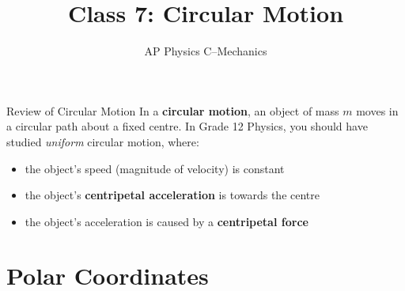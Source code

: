 \documentclass[12pt,compress,aspectratio=169]{beamer}
\title{Class 7: Circular Motion}
\subtitle{AP Physics C--Mechanics}
\begin{document}
\begin{frame}
  \maketitle
\end{frame}



\begin{frame}{Review of Circular Motion}
  In a \textbf{circular motion}, an object of mass $m$ moves in a circular path
  about a fixed centre. In Grade 12 Physics, you should have studied
  \emph{uniform} circular motion, where:
  \begin{itemize}
  \item the object's speed (magnitude of velocity) is constant
  \item the object's \textbf{centripetal acceleration} is towards the centre
  \item the object's acceleration is caused by a \textbf{centripetal force}
  \end{itemize}
\end{frame}



\section{Polar Coordinates}
\end{document}
